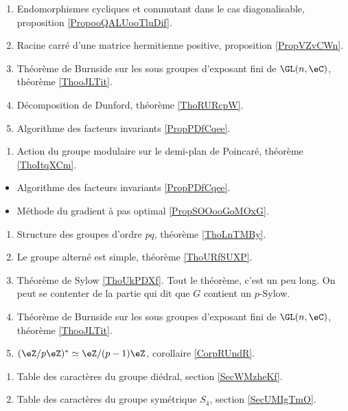     \begin{enumerate}
    \item Endomorphismes cycliques et commutant dans le cas diagonalisable, proposition \ref{PropooQALUooTluDif}.
    \item Racine carré d'une matrice hermitienne positive, proposition \ref{PropVZvCWn}.
    \item Théorème de Burnside sur les sous groupes d'exposant fini de \( \GL(n,\eC)\), théorème \ref{ThooJLTit}.
    \item Décomposition de Dunford, théorème \ref{ThoRURcpW}. 
    \item Algorithme des facteurs invariants \ref{PropPDfCqee}.
    \end{enumerate}

    \begin{enumerate}
    \item Action du groupe modulaire sur le demi-plan de Poincaré, théorème \ref{ThoItqXCm}. 
    \end{enumerate}

\begin{itemize}
    \item Algorithme des facteurs invariants \ref{PropPDfCqee}.
    \item Méthode du gradient à pas optimal \ref{PropSOOooGoMOxG}.
\end{itemize}

\begin{enumerate}
    \item Structure des groupes d'ordre \( pq\), théorème \ref{ThoLnTMBy}.
    \item Le groupe alterné est simple, théorème \ref{ThoURfSUXP}.
    \item Théorème de Sylow \ref{ThoUkPDXf}. Tout le théorème, c'est un peu long. On peut se contenter de la partie qui dit que \( G\) contient un \( p\)-Sylow.
    \item Théorème de Burnside sur les sous groupes d'exposant fini de \( \GL(n,\eC)\), théorème \ref{ThooJLTit}.
    \item \( (\eZ/p\eZ)^*\simeq \eZ/(p-1)\eZ\), corollaire \ref{CorpRUndR}.
\end{enumerate}

\begin{enumerate}
    \item Table des caractères du groupe diédral, section \ref{SecWMzheKf}.
    \item Table des caractères du groupe symétrique \( S_4\), section \ref{SecUMIgTmO}.
\end{enumerate}

